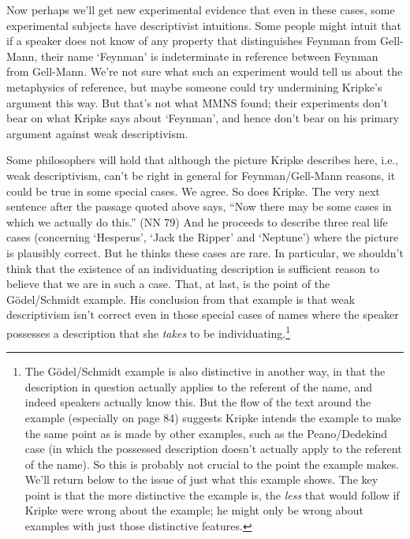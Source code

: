 Now perhaps we'll get new experimental evidence that even in these cases, some experimental subjects have descriptivist intuitions. Some people might intuit that if a speaker does not know of any property that distinguishes Feynman from Gell-Mann, their name `Feynman' is indeterminate in reference between Feynman from Gell-Mann. We're not sure what such an experiment would tell us about the metaphysics of reference, but maybe someone could try undermining Kripke's argument this way. But that's not what MMNS found; their experiments don't bear on what Kripke says about `Feynman', and hence don't bear on his primary argument against weak descriptivism.

Some philosophers will hold that although the picture Kripke describes here, i.e., weak descriptivism, can't be right in general for Feynman/Gell-Mann reasons, it could be true in some special cases. We agree. So does Kripke. The very next sentence after the passage quoted above says, ``Now there may be some cases in which we actually do this.'' (NN 79) And he proceeds to describe three real life cases (concerning `Hesperus', `Jack the Ripper' and `Neptune') where the picture is plausibly correct. But he thinks these cases are rare. In particular, we shouldn't think that the existence of an individuating description is sufficient reason to believe that we are in such a case. That, at last, is the point of the G\"{o}del\-/\-Schmidt example. His conclusion from that example is that weak descriptivism isn't correct even in those special cases of names where the speaker possesses a description that she \textit{takes} to be individuating.\footnote{The G\"{o}del\-/\-Schmidt example is also distinctive in another way, in that the description in question actually applies to the referent of the name, and indeed speakers actually know this. But the flow of the text around the example (especially on page 84) suggests Kripke intends the example to make the same point as is made by other examples, such as the Peano/Dedekind case (in which the possessed description doesn't actually apply to the referent of the name). So this is probably not crucial to the point the example makes. We'll return below to the issue of just what this example shows. The key point is that the more distinctive the example is, the \textit{less} that would follow if Kripke were wrong about the example; he might only be wrong about examples with just those distinctive features.}

